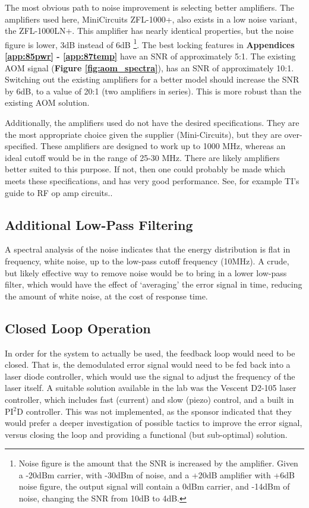 The most obvious path to noise improvement is selecting better amplifiers.  The amplifiers used here, MiniCircuits ZFL-1000+, also exists in a low noise variant, the ZFL-1000LN+.  This amplifier has nearly identical properties, but the noise figure is lower, 3dB instead of 6dB \footnote{Noise figure is the amount that the SNR is increased by the amplifier.  Given a -20dBm carrier, with -30dBm of noise, and a +20dB amplifier with +6dB noise figure, the output signal will contain a 0dBm carrier, and -14dBm of noise, changing the SNR from 10dB to 4dB.}. The best locking features in \textbf{Appendices \ref{app:85pwr} - \ref{app:87temp}} have an SNR of approximately 5:1. The existing AOM signal (\textbf{Figure \ref{fig:aom_spectra}}), has an SNR of approximately 10:1. Switching out the existing amplifiers for a better model should increase the SNR by 6dB, to a value of 20:1 (two amplifiers in series). This is more robust than the existing AOM solution.

Additionally, the amplifiers used do not have the desired specifications.  They are the most appropriate choice given the supplier (Mini-Circuits), but they are over-specified.  These amplifiers are designed to work up to 1000 MHz, whereas an ideal cutoff would be in the range of 25-30 MHz.  There are likely amplifiers better suited to this purpose.  If not, then one could probably be made which meets these specifications, and has very good performance.  See, for example TI's guide to RF op amp circuits.\cite{ti_amps}.

\subsection{Additional Low-Pass Filtering}

A spectral analysis of the noise indicates that the energy distribution is flat in frequency, white noise, up to the low-pass cutoff frequency (10MHz).  A crude, but likely effective way to remove noise would be to bring in a lower low-pass filter, which would have the effect of `averaging' the error signal in time, reducing the amount of white noise, at the cost of response time.


\subsection{Closed Loop Operation}

In order for the system to actually be used, the feedback loop would need to be closed.  That is, the demodulated error signal would need to be fed back into a laser diode controller, which would use the signal to adjust the frequency of the laser itself.  A suitable solution available in the lab was the Vescent D2-105 laser controller, which includes fast (current) and slow (piezo) control, and a built in PI$^2$D controller.  This was not implemented, as the sponsor indicated that they would prefer a deeper investigation of possible tactics to improve the error signal, versus closing the loop and providing a functional (but sub-optimal) solution.

